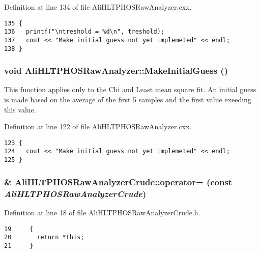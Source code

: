 Definition at line 134 of file Ali\-HLTPHOSRaw\-Analyzer.cxx.

\footnotesize\begin{verbatim}135 {
136   printf("\ntreshold = %d\n", treshold);
137   cout << "Make initial guess not yet implemeted" << endl;  
138 }
\end{verbatim}\normalsize 


\subsubsection{\setlength{\rightskip}{0pt plus 5cm}void Ali\-HLTPHOSRaw\-Analyzer::Make\-Initial\-Guess ()\hspace{0.3cm}{\tt  [inherited]}}\label{classAliHLTPHOSRawAnalyzer_AliHLTPHOSRawAnalyzerPeakFindera14}


This function applies only to the Chi and Least mean square fit. An initial guess is made based on the average of the first 5 samples and the first value exeeding this value. 

Definition at line 122 of file Ali\-HLTPHOSRaw\-Analyzer.cxx.

\footnotesize\begin{verbatim}123 {
124   cout << "Make initial guess not yet implemeted" << endl;
125 }
\end{verbatim}\normalsize 


\subsubsection{\& Ali\-HLTPHOSRaw\-Analyzer\-Crude::operator= (const  {\em Ali\-HLTPHOSRaw\-Analyzer\-Crude})\hspace{0.3cm}{\tt  [inline]}}\label{classAliHLTPHOSRawAnalyzerCrude_AliHLTPHOSRawAnalyzerCrudea2}




Definition at line 18 of file Ali\-HLTPHOSRaw\-Analyzer\-Crude.h.

\footnotesize\begin{verbatim}19     {
20       return *this; 
21     }
\end{verbatim}\normalsize 


